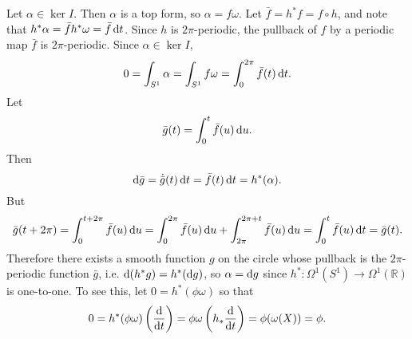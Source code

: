 \begin{xmpl}[Cohomology of $S^1$]
Let $\alpha \in \ker I$. Then $\alpha$ is a top form, so
$\alpha = f \omega$. Let
$\bar{f} = h^\ast f = f \circ h$, and note that
$h^\ast \alpha = \bar{f} h^\ast \omega = \bar{f} \mathop{}\!\mathrm{d} t$. Since
$h$ is $2\pi$-periodic, the pullback of $f$ by a periodic map
$\bar{f}$ is $2\pi$-periodic. Since $\alpha \in \ker I$,
$$
0
= \int_{S^1} \alpha
= \int_{S^1} f \omega
= \int_0^{2\pi} \bar{f}(t) \mathop{}\!\mathrm{d} t.
$$
Let
$$
  \bar{g}(t)
= \int_0^t
    \bar{f}(u) \mathop{}\!\mathrm{d} u.
$$
Then
$$
  \mathop{}\!\mathrm{d} \bar{g}
= \dot{\bar{g}}(t) \mathop{}\!\mathrm{d} t
= \bar{f}(t) \mathop{}\!\mathrm{d} t
= h^\ast(\alpha).
$$
But
$$
  \bar{g}(t + 2 \pi)
= \int_0^{t + 2 \pi}
    \bar{f}(u) \mathop{}\!\mathrm{d} u
= \int_0^{2\pi}
    \bar{f}(u) \mathop{}\!\mathrm{d} u
+ \int_{2\pi}^{2\pi + t}
    \bar{f}(u) \mathop{}\!\mathrm{d} u
= \int_0^t \bar{f}(u) \mathop{}\!\mathrm{d} t
= \bar{g}(t).
$$
Therefore there exists a smooth function $g$ on the circle whose pullback
is the $2\pi$-periodic function $\bar{g}$, i.e.
$\mathop{}\!\mathrm{d} (h^\ast g) = h^\ast (\mathop{}\!\mathrm{d} g)$, so $\alpha = \mathop{}\!\mathrm{d} g$ since
$h^\ast : \Omega^1(S^1) \to \Omega^1(\mathbb{R})$ is one-to-one.
To see this, let $0 = h^\ast(\phi \omega)$ so that
$$
  0
= h^\ast(\phi \omega) \left(\frac{\mathop{}\!\mathrm{d}}{\mathop{}\!\mathrm{d} t}\right)
= \phi \omega \left(h_\ast \frac{\mathop{}\!\mathrm{d}}{\mathop{}\!\mathrm{d} t}\right)
= \phi(\omega(X))
= \phi.
$$
\end{xmpl}

